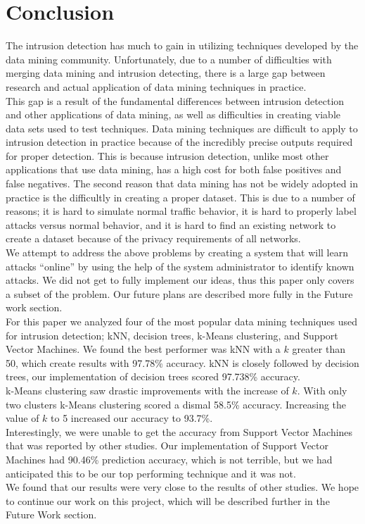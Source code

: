 \documentclass[12pt]{article} %
\begin{document}
\section{Conclusion}
The intrusion detection has much to gain in utilizing techniques developed by the data mining community. Unfortunately, due to a number of difficulties with merging data mining and intrusion detecting, there is a large gap between research and actual application of data mining techniques in practice.\\
This gap is a result of the fundamental differences between intrusion detection and other applications of data mining, as well as difficulties in creating viable data sets used to test techniques. Data mining techniques are difficult to apply to intrusion detection in practice because of the incredibly precise outputs required for proper detection. This is because intrusion detection, unlike most other applications that use data mining, has a high cost for both false positives and false negatives. The second reason that data mining has not be widely adopted in practice is the difficultly in creating a proper dataset. This is due to a number of reasons; it is hard to simulate normal traffic behavior, it is hard to properly label attacks versus normal behavior, and it is hard to find an existing network to create a dataset because of the privacy requirements of all networks.\\
We attempt to address the above problems by creating a system that will learn attacks ``online'' by using the help of the system administrator to identify known attacks. We did not get to fully implement our ideas, thus this paper only covers a subset of the problem. Our future plans are described more fully in the Future work section.\\
For this paper we analyzed four of the most popular data mining techniques used for intrusion detection; kNN, decision trees, k-Means clustering, and Support Vector Machines. We found the best performer was kNN with a $k$ greater than 50, which create results with 97.78\% accuracy. kNN is closely followed by decision trees, our implementation of decision trees scored 97.738\% accuracy.\\
k-Means clustering saw drastic improvements with the increase of $k$. With only two clusters k-Means clustering scored a dismal 58.5\% accuracy. Increasing the value of $k$ to 5 increased our accuracy to 93.7\%.\\
Interestingly, we were unable to get the accuracy from Support Vector Machines that was reported by other studies. Our implementation of Support Vector Machines had 90.46\% prediction accuracy, which is not terrible, but we had anticipated this to be our top performing technique and it was not.\\
We found that our results were very close to the results of other studies. We hope to continue our work on this project, which will be described further in the Future Work section.\\
\end{document}
